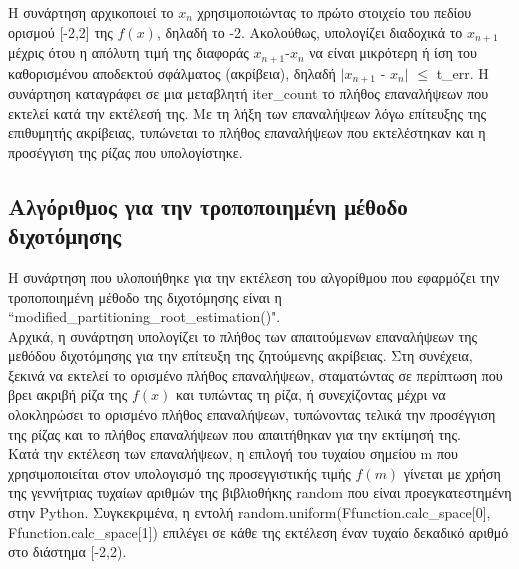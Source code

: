 \documentclass[a4paper,11pt]{article}
\newcommand{\lt}{\latintext}
\begin{document}
Η συνάρτηση αρχικοποιεί το {$x_{n}$} χρησιμοποιώντας το πρώτο στοιχείο του πεδίου ορισμού [-2,2] της {\lt $f(x)$}, δηλαδή το -2. Ακολούθως, υπολογίζει διαδοχικά το  {$x_{n+1}$} μέχρις ότου
η απόλυτη τιμή της διαφοράς {$x_{n+1}$}-{$x_{n}$} να είναι μικρότερη ή ίση του καθορισμένου αποδεκτού σφάλματος (ακρίβεια), δηλαδή $|${$x_{n+1}$} - {$x_{n}$}$|$ {$\leq$} {\lt t\_err}. Η συνάρτηση καταγράφει σε 				μια μεταβλητή {\lt iter\_count} το πλήθος επαναλήψεων που εκτελεί κατά την εκτέλεσή της. Με τη λήξη των επαναλήψεων λόγω επίτευξης της επιθυμητής ακρίβειας, τυπώνεται το πλήθος επαναλήψεων που 						εκτελέστηκαν και η προσέγγιση της ρίζας που υπολογίστηκε.
\subsection*{Αλγόριθμος για την τροποποιημένη μέθοδο διχοτόμησης}
Η συνάρτηση που υλοποιήθηκε για την εκτέλεση του αλγορίθμου που εφαρμόζει την τροποποιημένη μέθοδο της διχοτόμησης είναι η {\lt ``modified\_partitioning\_root\_estimation()"}. \\
Αρχικά, η συνάρτηση υπολογίζει το πλήθος των απαιτούμενων επαναλήψεων της μεθόδου διχοτόμησης για την επίτευξη της ζητούμενης ακρίβειας.  Στη συνέχεια, ξεκινά να εκτελεί το ορισμένο πλήθος επαναλήψεων, 				σταματώντας σε περίπτωση που βρει ακριβή ρίζα της {\lt$f(x)$} και τυπώντας τη ρίζα, ή συνεχίζοντας μέχρι να ολοκληρώσει το ορισμένο πλήθος επαναλήψεων, τυπώνοντας τελικά την προσέγγιση της ρίζας και το 				πλήθος επαναλήψεων που απαιτήθηκαν για την εκτίμησή της. \\
Κατά την εκτέλεση των επαναλήψεων, η επιλογή του τυχαίου σημείου {\lt m} που χρησιμοποιείται στον υπολογισμό της προσεγγιστικής τιμής {\lt $f(m)$} γίνεται με χρήση της γεννήτριας τυχαίων αριθμών της βιβλιοθήκης 
random που είναι προεγκατεστημένη στην Python. Συγκεκριμένα, η εντολή {\lt random.uniform(Ffunction.calc\_space[0], Ffunction.calc\_space[1])} επιλέγει σε κάθε της εκτέλεση έναν τυχαίο δεκαδικό αριθμό στο διάστημα [-2,2).
\end{document}
